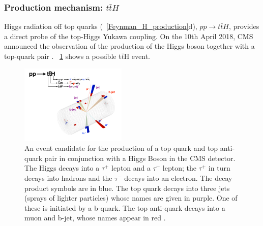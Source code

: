 \subsubsection{Production mechanism: $t\bar{t}H$}
Higgs radiation off top quarks (\figurename~\ref{Feynman_H_production}d), $pp \to t\bar{t}H$, provides a direct probe of the top-Higgs Yukawa coupling. On the 10th April 2018, CMS announced the observation of the production of the Higgs boson together with a top-quark pair \cite{ttH}. \figurename~\ref{ttH} shows a possible t$\bar{t}$H event.
\begin{figure}[htbp]
\centering
\includegraphics[width=0.45\textwidth]{Images/ttH}
\caption{An event candidate for the production of a top quark and top anti-quark pair in conjunction with a Higgs Boson in the CMS detector. The Higgs decays into a $\tau^+$ lepton and a $\tau^-$ lepton; the $\tau^+$ in turn decays into hadrons and the $\tau^-$ decays into an electron. The decay product symbols are in blue. The top quark decays into three jets (sprays of lighter particles) whose names are given in purple. One of these is initiated by a b-quark. The top anti-quark decays into a muon and b-jet, whose names appear in red \cite{ttH_event}.}
\label{ttH}
\end{figure}


